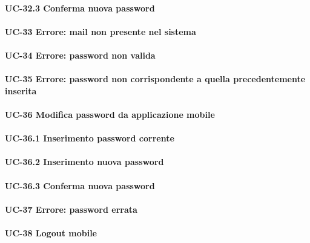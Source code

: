     \paragraph{UC-32.3 Conferma nuova password}

\paragraph{UC-33 Errore: mail non presente nel sistema}

\paragraph{UC-34 Errore: password non valida}

\paragraph{UC-35 Errore: password non corrispondente a quella precedentemente inserita}

\paragraph{UC-36 Modifica password da applicazione mobile}

    \paragraph{UC-36.1 Inserimento password corrente}

    \paragraph{UC-36.2 Inserimento nuova password}

    \paragraph{UC-36.3 Conferma nuova password}

\paragraph{UC-37 Errore: password errata}

\paragraph{UC-38 Logout mobile}